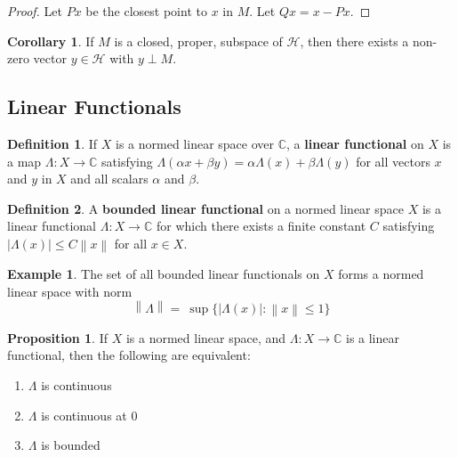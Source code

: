 \documentclass{article}
\theoremstyle{definition}
\newtheorem{example}{Example}
\newtheorem*{defn}{Definition}
\newtheorem{corollary}{Corollary}
\newtheorem{proposition}{Proposition}
\newcommand{\norm}[1]{\left\lVert#1\right\rVert}
\begin{document}
    \begin{proof}
        Let $Px$ be the closest point to $x$ in $M$. Let $Qx = x - Px$.
    \end{proof}

    \begin{corollary}
        If $M$ is a closed, proper, subspace of $\mathcal{H}$, then there exists a non-zero vector $y\in\mathcal{H}$ with
        $y\perp M$.
    \end{corollary}

    \subsection{Linear Functionals}

    \begin{defn}
        If $X$ is a normed linear space over $\mathbb{C}$, a \textbf{linear functional} on $X$ is a map $\Lambda:X\to\mathbb{C}$
        satisfying $\Lambda(\alpha x + \beta y) = \alpha \Lambda(x) + \beta \Lambda(y)$ for all vectors $x$ and $y$ in $X$ and
        all scalars $\alpha$ and $\beta$.
    \end{defn}

    \begin{defn}
        A \textbf{bounded linear functional} on a normed linear space $X$ is a linear functional $\Lambda:X\to\mathbb{C}$ for
        which there exists a finite constant $C$ satisfying $|\Lambda(x)|\leq C\norm{x}$ for all $x\in X$.
    \end{defn}

    \begin{example}
        The set of all bounded linear functionals on $X$ forms a normed linear space with norm
        \[ \norm{\Lambda} =\:\sup\{|\Lambda(x)|:\norm{x}\leq 1\} \]
    \end{example}

    \begin{proposition}
        If $X$ is a normed linear space, and $\Lambda:X\to\mathbb{C}$ is a linear functional, then the following are
        equivalent:
        \begin{enumerate}
            \item $\Lambda$ is continuous
            \item $\Lambda$ is continuous at 0
            \item $\Lambda$ is bounded
        \end{enumerate}
    \end{proposition}
\end{document}
